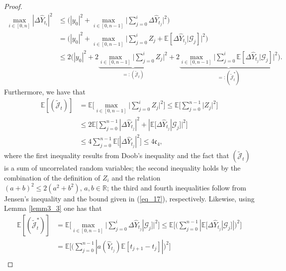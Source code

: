 \begin{proof}
\begin{equation}\label{eq_18}
\begin{split}
    \max_{i \in [0, n]}|\Delta \hat{Y}_{t_{i}}|^2 &\leq \bigg(|y_0|^2 +  \max_{i \in [0, n-1]} \bigg| \sum_{j=0}^i \Delta \hat{Y}_{t_{j}} \bigg|^2\bigg)\\
    &= \bigg(|y_0|^2 +  \max_{i \in [0, n-1]} \bigg| \sum_{j=0}^i Z_j + \mathbb{E}[\Delta \hat{Y}_{t_{j}}|\mathcal{G}_{j}] \bigg|^2\bigg)\\
    &\leq  2 \bigg(|y_0|^2 + 2 \underbrace{\max_{i \in [0, n-1]} \bigg| \sum_{j=0}^i Z_j  \bigg|^2}_{{=:(\tilde{\mathcal{J}}_t)}}  + 2 \underbrace{\max_{i \in [0, n-1]} \bigg| \sum_{j=0}^i \mathbb{E}[\Delta \hat{Y}_{t_{j}}|\mathcal{G}_{j}] \bigg|^2}_{{=:(\tilde{\mathcal{J}}^{*}_t)}}\bigg).
\end{split}
\end{equation}
Furthermore, we have that
\begin{equation*}
    \begin{split}
        \mathbb{E}[(\tilde{\mathcal{J}}_t)] &= \mathbb{E}\bigg[\max_{i \in [0, n-1]} \bigg| \sum_{j=0}^i Z_j  \bigg|^2\bigg] \leq \mathbb{E}\bigg[ \sum_{j=0}^{n-1} \big|Z_j  \big|^2\bigg]\\
        &\leq 2 \mathbb{E}\bigg[ \sum_{j=0}^{n-1} |\Delta \hat{Y}_{t_{j}}|^2 + |\mathbb{E}[\Delta \hat{Y}_{t_{j}}|\mathcal{G}_{j}]|^2\bigg]\\
        &\leq 4  \sum_{j=0}^{n-1} \mathbb{E} \big[ |\Delta \hat{Y}_{t_{j}}|^2 \big] \leq 4 \mathfrak{c}_4,
    \end{split}
\end{equation*}
where the first inequality results from Doob's inequality and the fact that $(\tilde{\mathcal{J}}_t)$ is a sum of uncorrelated random variables; the second inequality holds by the combination of the definition of $Z_i$ and the relation $(a + b)^2 \leq 2(a^2+b^2), \, a,b \in \mathbb{R}$; the third and fourth inequalities follow from Jensen's inequality and the bound given in (\ref{eq_17}), respectively.
Likewise, using Lemma \ref{lemm3_3} one has that
\begin{equation*}
    \begin{split}
        \mathbb{E}[(\tilde{\mathcal{J}}^{*}_t)] &= \mathbb{E}\bigg[\max_{i \in [0, n-1]} \bigg| \sum_{j=0}^i \Delta \hat{Y}_{t_{j}}|\mathcal{G}_{j}]  \bigg|^2\bigg] \leq \mathbb{E}\bigg[\bigg(\sum_{j=0}^{n-1} |\mathbb{E}[\Delta \hat{Y}_{t_{j}}|\mathcal{G}_{j}]|\bigg)^2 \bigg]\\
        &= \mathbb{E}\bigg[\bigg(\sum_{j=0}^{n-1} |a(\hat{Y}_{t_{j}}) \mathbb{E}[t_{j+1} - t_{j}]|\bigg)^2 \bigg]\\

\end{split}
\end{equation*}
\end{proof}
